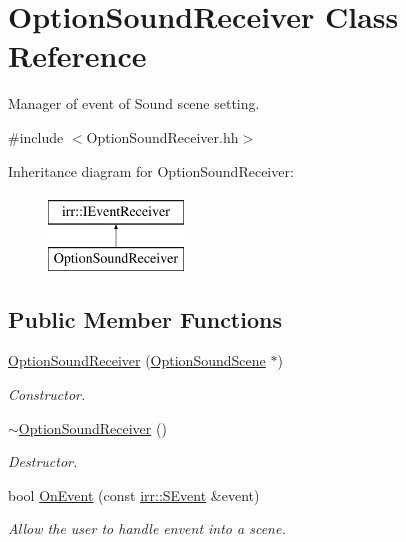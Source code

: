 \hypertarget{classOptionSoundReceiver}{}\section{Option\+Sound\+Receiver Class Reference}
\label{classOptionSoundReceiver}


Manager of event of Sound scene setting.  




{\ttfamily \#include $<$Option\+Sound\+Receiver.\+hh$>$}

Inheritance diagram for Option\+Sound\+Receiver\+:\begin{figure}[H]
\begin{center}
\leavevmode
\includegraphics[height=2.000000cm]{classOptionSoundReceiver}
\end{center}
\end{figure}
\subsection*{Public Member Functions}
\begin{DoxyCompactItemize}
\item 
\hyperlink{classOptionSoundReceiver_aac72bf7db0c7610a37f9f14984f087ef}{Option\+Sound\+Receiver} (\hyperlink{classOptionSoundScene}{Option\+Sound\+Scene} $\ast$)
\begin{DoxyCompactList}\small\item\em Constructor. \end{DoxyCompactList}\item 
\hyperlink{classOptionSoundReceiver_aca3553e7a1777ed7e39111325b09954a}{$\sim$\+Option\+Sound\+Receiver} ()
\begin{DoxyCompactList}\small\item\em Destructor. \end{DoxyCompactList}\item 
bool \hyperlink{classOptionSoundReceiver_ae7c9643b12df38a45d4e3d629274019c}{On\+Event} (const \hyperlink{structirr_1_1SEvent}{irr\+::\+S\+Event} \&event)
\begin{DoxyCompactList}\small\item\em Allow the user to handle envent into a scene. \end{DoxyCompactList}\end{DoxyCompactItemize}


